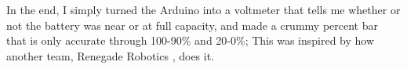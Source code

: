 In the end, I simply turned the Arduino into a voltmeter that tells me whether or not the battery was near or at full capacity, and made a crummy percent bar that is only accurate through 100-90\% and 20-0\%; This was inspired by how another team, Renegade Robotics \cite{RenegadeRobotics}, does it.
